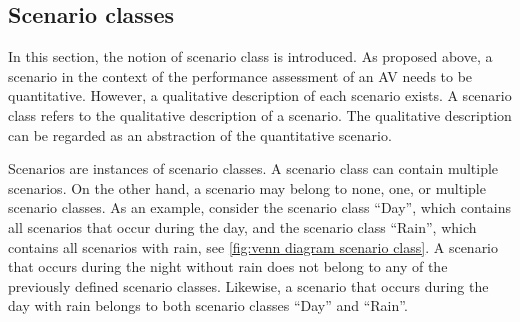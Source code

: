\subsection{Scenario classes}
\label{sec:scenario classes}
In this section, the notion of scenario class is introduced. As proposed above, a scenario in the context of the performance assessment of an AV needs to be quantitative. However, a qualitative description of each scenario exists. 
\cbstart
A scenario class refers to the qualitative description of a scenario.
The qualitative description can be regarded as an abstraction of the quantitative scenario. 


Scenarios are instances of scenario classes. A scenario class can contain multiple scenarios. On the other hand, a scenario may belong to none, one, or multiple scenario classes. As an example, consider the scenario class ``Day'', which contains all scenarios that occur during the day, and the scenario class ``Rain'', which contains all scenarios with rain, see \cref{fig:venn diagram scenario class}. A scenario that occurs during the night without rain does not belong to any of the previously defined scenario classes. Likewise, a scenario that occurs during the day with rain belongs to both scenario classes ``Day'' and ``Rain''. 

